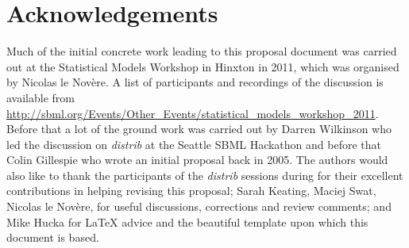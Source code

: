 \documentclass[draftspec]{sbmlpkgspec}
\newcommand{\distribshort}{\emph{distrib}\xspace}
\begin{document}


\section{Acknowledgements}
\label{sec:acknowledgements}

Much of the initial concrete work leading to this proposal document
was carried out at the Statistical Models Workshop in Hinxton in 2011,
which was organised by Nicolas le Nov\`{e}re. A list of participants
and recordings of the discussion is available from
\url{http://sbml.org/Events/Other_Events/statistical_models_workshop_2011}.
Before that a lot of the ground work was carried out by Darren
Wilkinson who led the discussion on \distribshort at the Seattle SBML
Hackathon and before that Colin Gillespie who wrote an initial
proposal back in 2005. The authors would also like to thank the
participants of the \distribshort sessions during  for their excellent contributions in helping revising
this proposal; Sarah Keating, Maciej Swat, Nicolas le Nov\`{e}re, 
for useful discussions, corrections and review comments; and Mike
Hucka for \LaTeX{} advice and the beautiful template upon which this
document is based.

\appendix










\end{document}
